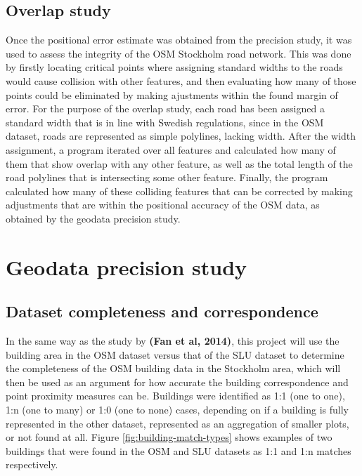 \documentclass{kththesis}
\begin{document}
\subsection{Overlap study}

Once the positional error estimate was obtained from the precision study, it was used to assess the integrity of the OSM Stockholm road network.
This was done by firstly locating critical points where assigning standard widths to the roads would cause collision with other features, and then evaluating how many of those points could be eliminated by making ajustments within the found margin of error.
For the purpose of the overlap study, each road has been assigned a standard width that is in line with Swedish regulations, since in the OSM dataset, roads are represented as simple polylines, lacking width.
After the width assignment, a program iterated over all features and calculated how many of them that show overlap with any other feature, as well as the total length of the road polylines that is intersecting some other feature.
Finally, the program calculated how many of these colliding features that can be corrected by making adjustments that are within the positional accuracy of the OSM data, as obtained by the geodata precision study.

\section{Geodata precision study}

\subsection{Dataset completeness and correspondence}

In the same way as the study by \textbf{(Fan et al, 2014)}, this project will use the building area in the OSM dataset versus that of the SLU dataset to determine the completeness of the OSM building data in the Stockholm area, which will then be used as an argument for how accurate the building correspondence and point proximity measures can be.
Buildings were identified as 1:1 (one to one), 1:n (one to many) or 1:0 (one to none) cases, depending on if a building is fully represented in the other dataset, represented as an aggregation of smaller plots, or not found at all.
Figure \ref{fig:building-match-types} shows examples of two buildings that were found in the OSM and SLU datasets as 1:1 and 1:n matches respectively.
\end{document}
